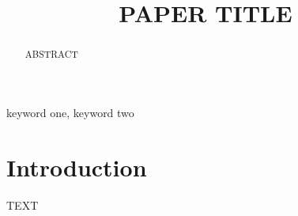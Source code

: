\documentclass[conference]{IEEEtran}
\begin{document}
\title{PAPER TITLE}

\author{}

\maketitle

\begin{abstract}
ABSTRACT
\end{abstract}

\begin{IEEEkeywords}
keyword one, keyword two
\end{IEEEkeywords}

\section{Introduction}
TEXT



\end{document}
